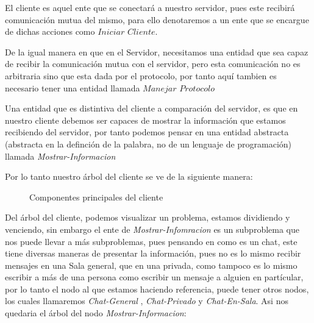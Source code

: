 \documentclass[10pt,letterpaper]{report}
\begin{document}
\vspace{0.5cm}

\noindent El cliente es aquel ente que se conectará a nuestro servidor, pues este recibirá comunicación mutua del mismo, para ello denotaremos a un ente que se encargue de dichas acciones como $Iniciar$ $Cliente$.

\vspace{0.2cm}

\noindent De la igual manera en que en el Servidor, necesitamos una entidad que sea capaz de recibir la comunicación mutua con el servidor, pero esta comunicación no es arbitraria sino que esta dada por el protocolo, por tanto aquí tambien es necesario tener una entidad llamada $Manejar$ $Protocolo$

\vspace{0.2cm}

\noindent Una entidad que es distintiva del cliente a comparación del servidor, es que en nuestro cliente debemos ser capaces de mostrar la información que estamos recibiendo del servidor, por tanto podemos pensar en una entidad abstracta (abstracta en la definción de la palabra, no de un lenguaje de programación) llamada \textit{Mostrar-Informacion}

\vspace{0.2cm}

\noindent Por lo tanto nuestro árbol del cliente se ve de la siguiente manera: 

\vspace{0.5cm}
\begin{figure}[H]
\centering


\caption{Componentes principales del cliente}
\label{fig:componentes-cliente}
\end{figure}

\vspace{0.5cm}

\noindent Del árbol del cliente, podemos visualizar un problema, estamos dividiendo y venciendo, sin embargo el ente de \textit{Mostrar-Infomracion} es un subproblema que nos puede llevar a más subproblemas, pues pensando en como es un chat, este tiene diversas maneras de presentar la información, pues no es lo mismo recibir mensajes en una Sala general, que en una privada, como tampoco es lo mismo escribir a más de una persona como escribir un mensaje a alguien en partícular, por lo tanto el nodo al que estamos haciendo referencia, puede tener otros nodos, los cuales llamaremos \textit{Chat-General}  , \textit{Chat-Privado} y \textit{Chat-En-Sala}. Asi nos quedaria el árbol del nodo \textit{Mostrar-Informacion}:
\end{document}
